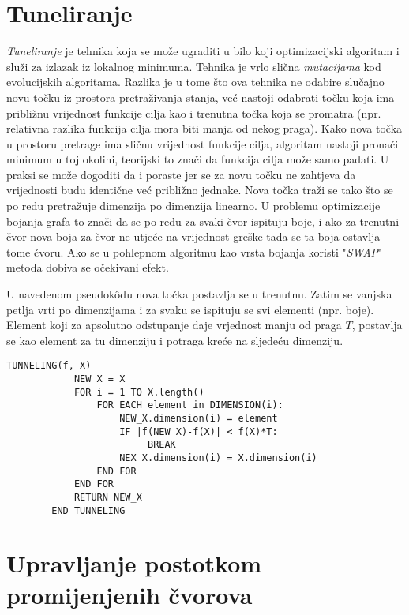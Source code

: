 \documentclass[times, utf8, diplomski, numeric]{fer}
\begin{document}
\section{Tuneliranje}

\emph{Tuneliranje} je tehnika koja se može ugraditi u bilo koji optimizacijski algoritam i služi za izlazak iz lokalnog minimuma. Tehnika je vrlo slična \emph{mutacijama} kod evolucijskih algoritama. Razlika je u tome što ova tehnika ne odabire slučajno novu točku iz prostora pretraživanja stanja, već nastoji odabrati točku koja ima približnu vrijednost funkcije cilja kao i trenutna točka koja se promatra (npr. relativna razlika funkcija cilja mora biti manja od nekog praga). Kako nova točka u prostoru pretrage ima sličnu vrijednost funkcije cilja, algoritam nastoji pronaći minimum u toj okolini, teorijski to znači da funkcija cilja može samo padati. U praksi se može dogoditi da i poraste jer se za novu točku ne zahtjeva da vrijednosti budu identične već približno jednake. Nova točka traži se tako što se po redu pretražuje dimenzija po dimenzija linearno. U problemu optimizacije bojanja grafa to znači da se po redu za svaki čvor ispituju boje, i ako za trenutni čvor nova boja za čvor ne utjeće na vrijednost greške tada se ta boja ostavlja tome čvoru. Ako se u pohlepnom algoritmu kao vrsta bojanja koristi "\emph{SWAP}" metoda dobiva se očekivani efekt. 

U navedenom pseudok\^{o}du nova točka postavlja se u trenutnu. Zatim se vanjska petlja vrti po dimenzijama i za svaku se ispituju se svi elementi (npr. boje). Element koji za apsolutno odstupanje daje vrjednost manju od praga $T$, postavlja se kao element za tu dimenziju i potraga kreće na sljedeću dimenziju.

\begin{singlespace}
	\begin{lstlisting}[caption=Metoda tuneliranja - implementacija]
		TUNNELING(f, X)
			NEW_X = X
			FOR i = 1 TO X.length()
				FOR EACH element in DIMENSION(i):
					NEW_X.dimension(i) = element
					IF |f(NEW_X)-f(X)| < f(X)*T:
						 BREAK
					NEX_X.dimension(i) = X.dimension(i)
				END FOR
			END FOR
			RETURN NEW_X
		END TUNNELING
	\end{lstlisting}
\end{singlespace}

\section{Upravljanje postotkom promijenjenih čvorova}
\end{document}

